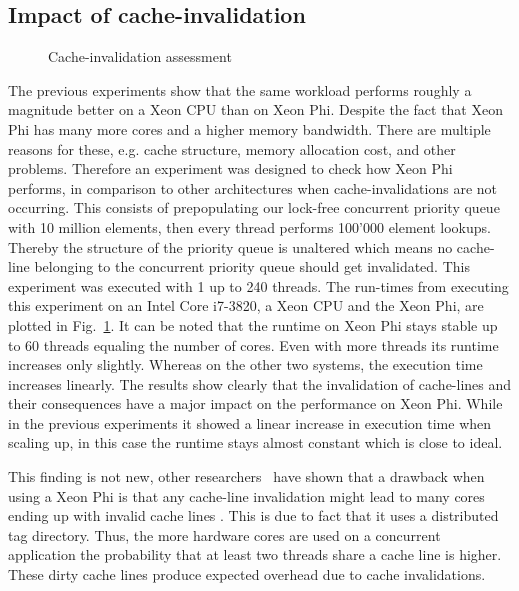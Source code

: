 \subsection{Impact of cache-invalidation}
\begin{figure}[t]
	\centering
	
	\caption{Cache-invalidation assessment}
	\label{fig:comp_contains}
\end{figure}
The previous experiments show that the same workload performs roughly a magnitude better on a Xeon CPU than on Xeon Phi.
Despite the fact that Xeon Phi has many more cores and a higher memory bandwidth.
There are multiple reasons for these, e.g. cache structure, memory allocation cost, and other problems.
Therefore an experiment was designed to check how Xeon Phi performs, in comparison to other architectures when cache-invalidations are not occurring.
This consists of prepopulating our lock-free concurrent priority queue with 10 million elements, then every thread performs 100'000 element lookups.
Thereby the structure of the priority queue is unaltered which means no cache-line belonging to the concurrent priority queue should get invalidated.
This experiment was executed with 1 up to 240 threads. The run-times from executing this experiment on an Intel Core i7-3820, a Xeon CPU and the Xeon Phi, are plotted in Fig.~\ref{fig:comp_contains}.
It can be noted that the runtime on Xeon Phi stays stable up to 60 threads equaling the number of cores. Even with more threads its runtime increases only slightly.
Whereas on the other two systems, the execution time increases linearly.
The results show clearly that the invalidation of cache-lines and their consequences have a major impact on the performance on Xeon Phi.
While in the previous experiments it showed a linear increase in execution time when scaling up, in this case the runtime stays almost constant which is close to ideal.

This finding is not new, other researchers~\cite{ramos-hoefler-cc-modeling} have shown that a drawback when using a Xeon Phi is that any cache-line invalidation might lead to many cores ending up with invalid cache lines . This is due to fact that it uses a distributed tag directory. Thus, the more hardware cores are used on a concurrent application the probability that at least two threads share a cache line is higher. These dirty cache lines produce expected overhead due to cache invalidations.

